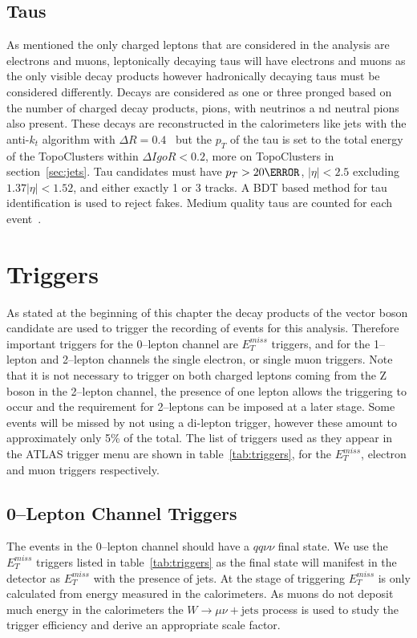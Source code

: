 \subsection{Taus}

As mentioned the only charged leptons that are considered in the analysis are
electrons and muons, leptonically decaying taus will have electrons and muons as
the only visible decay products however hadronically decaying taus must be
considered differently. Decays are considered as one or three pronged based on
the number of charged decay products, pions, with neutrinos a
nd neutral pions
also present. These decays are reconstructed in the calorimeters like jets with
the anti-$k_t$ algorithm with $\Delta R = 0.4$~\cite{tau-reco} but the $p_T$ of
the tau is set to the total energy of the TopoClusters within $\Delta I goR < 0.2$,
more on TopoClusters in section~\ref{sec:jets}. Tau candidates must have $p_T >
20 \GeV$, $\lvert  \eta \rvert < 2.5$ excluding $1.37 \lvert \eta \rvert < 1.52$,
and either exactly 1 or 3 tracks. A BDT based method for tau identification is
used to reject fakes. Medium quality taus are counted for each event~\cite{med-taus2}.

\section{Triggers}
\label{sec:triggers}

As stated at the beginning of this chapter the decay products of the vector
boson candidate are used to trigger the recording of events for this analysis.
Therefore important triggers for the 0--lepton channel are $E_T^{miss}$ triggers,
and for the 1--lepton and 2--lepton channels the single electron, or single muon
triggers. Note that it is not necessary to trigger on both charged leptons
coming from the Z boson in the 2--lepton channel, the presence of one lepton
allows the triggering to occur and the requirement for 2--leptons can be imposed
at a later stage. Some events will be missed by not using a di-lepton trigger,
however these amount to approximately only 5\% of the total. The list of
triggers used as they appear in the ATLAS trigger menu are shown in
table~\ref{tab:triggers}, for the $E_T^{miss}$, electron and muon triggers
respectively.


\subsection{0--Lepton Channel Triggers}
The events in the 0--lepton channel should have a $qq\nu\nu$ final state. We use
the $E_T^{miss}$ triggers listed in table~\ref{tab:triggers} as the final state
will manifest in the detector as $E_T^{miss}$ with the presence of jets. At the
stage of triggering $E_T^{miss}$ is only calculated from energy measured in the
calorimeters. As muons do not deposit much energy in the calorimeters the $W
\rightarrow \mu \nu + \text{jets}$ process is used to study the trigger
efficiency and derive an appropriate scale factor.


